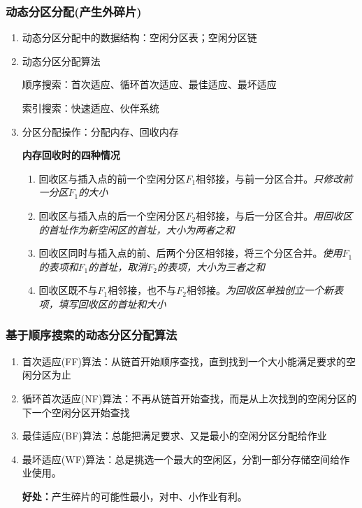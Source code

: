 \documentclass{article}
\begin{document}
\subsubsection{\color{red}动态分区分配(产生外碎片)}
\begin{enumerate}
    \item 动态分区分配中的数据结构：空闲分区表；空闲分区链
    \item 动态分区分配算法
    
    顺序搜索：首次适应、循环首次适应、最佳适应、最坏适应

    索引搜索：快速适应、伙伴系统
    \item 分区分配操作：分配内存、回收内存
    
    \textbf{内存回收时的四种情况}
    \begin{enumerate}
        \item 回收区与插入点的前一个空闲分区$F_1$相邻接，与前一分区合并。\textit{只修改前一分区$F_1$的大小}
        \item 回收区与插入点的后一个空闲分区$F_2$相邻接，与后一分区合并。\textit{用回收区的首址作为新空闲区的首址，大小为两者之和}
        \item 回收区同时与插入点的前、后两个分区相邻接，将三个分区合并。\textit{使用$F_1$的表项和$F_1$的首址，取消$F_2$的表项，大小为三者之和}
        \item 回收区既不与$F_1$相邻接，也不与$F_2$相邻接。\textit{为回收区单独创立一个新表项，填写回收区的首址和大小}
    \end{enumerate}
\end{enumerate}

\subsubsection{\color{red}基于顺序搜索的动态分区分配算法}
\begin{enumerate}
    \item 首次适应(FF)算法：从链首开始顺序查找，直到找到一个大小能满足要求的空闲分区为止
    \item 循环首次适应(NF)算法：不再从链首开始查找，而是从上次找到的空闲分区的下一个空闲分区开始查找
    \item 最佳适应(BF)算法：总能把满足要求、又是最小的空闲分区分配给作业
    \item 最坏适应(WF)算法：总是挑选一个最大的空闲区，分割一部分存储空间给作业使用。
    
    \textbf{好处：}产生碎片的可能性最小，对中、小作业有利。
\end{enumerate}
\vspace*{-0.4cm}
\end{document}
